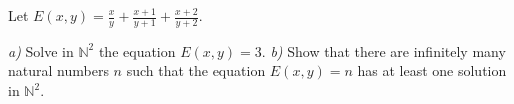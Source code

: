 Let $ E(x,y)=\frac{x}{y} +\frac{x+1}{y+1} +\frac{x+2}{y+2} . $

\textit{a)} Solve in $ \mathbb{N}^2 $ the equation $ E(x,y)=3. $
\textit{b)} Show that there are infinitely many natural numbers $ n $ such that the equation $ E(x,y)=n $ has at least one solution in $ \mathbb{N}^2. $